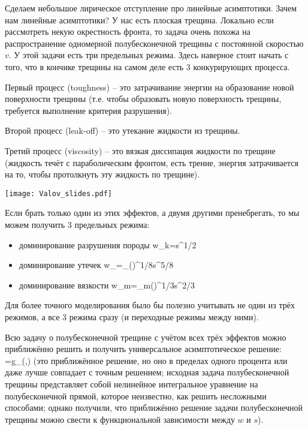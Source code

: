 \documentclass[main.tex]{subfiles}
\begin{document}
Сделаем небольшое лирическое отступление про линейные асимптотики.
Зачем нам линейные асимптотики?
У нас есть плоская трещина.
Локально если рассмотреть некую окрестность фронта, то задача очень похожа на распространение одномерной полубесконечной трещины с постоянной скоростью $v$.
У этой задачи есть три предельных режима.
Здесь наверное стоит начать с того, что в кончике трещины на самом деле есть 3 конкурирующих процесса.

Первый процесс (toughness) -- это  затрачивание энергии на образование новой поверхности трещины (т.е. чтобы образовать новую поверхность трещины, требуется выполнение критерия разрушения).

Второй процесс (leak-off) -- это утекание жидкости из трещины.

Третий процесс (viscosity) -- это вязкая диссипация жидкости по трещине (жидкость течёт с параболическим фронтом, есть трение, энергия затрачивается на то, чтобы протолкнуть эту жидкость по трещине).

\begin{center}
\texttt{[image: Valov\_slides.pdf]}
\end{center}

Если брать только один из этих эффектов, а двумя другими пренебрегать, то мы можем получить 3 предельных режима:
\begin{itemize}
	\item доминирование разрушения породы
	\beq
	w_k=s^{1/2}
	\eeq
	\item доминирование утечек
	\beq
	w_{}=\beta_{}\left(\right)^{1/8}s^{5/8}
	\eeq
	\item доминирование вязкости
	\beq
	w_m=\beta_m\left(\right)^{1/3}s^{2/3}
	\eeq
\end{itemize}

Для более точного моделирования было бы полезно учитывать не один из трёх режимов, а все 3 режима сразу (и переходные режимы между ними).

Всю задачу о полубесконечной трещине с учётом всех трёх эффектов можно приближённо решить и получить универсальное асимптотическое решение:
\beq
{}=g_\delta\left(,\right)
\eeq
(это приближённое решение, но оно в пределах одного процента или даже лучше совпадает с точным решением; исходная задача полубесконечной трещины представляет собой нелинейное интегральное уравнение на полубесконечной прямой, которое неизвестно, как решить несложными способами; однако получили, что приближённо решение задачи полубесконечной трещины можно свести к функциональной зависимости между $w$ и $s$).
\end{document}
